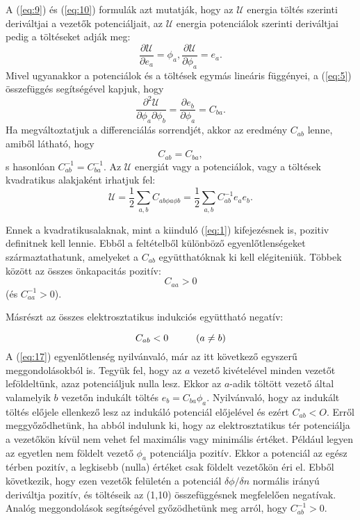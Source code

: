 \documentclass{article}
\begin{document}
A (\ref{eq:9}) és (\ref{eq:10}) formulák azt mutatják, hogy az $\mathcal{U}$ energia töltés szerinti deriváltjai a vezetők potenciáljait, az $\mathcal{U}$ energia potenciálok szerinti deriváltjai pedig a töltéseket adják meg:
\begin{equation} \label{eq:12}
\frac{\partial \mathcal{U}}{\partial e_a} = \phi_a , \frac{\partial \mathcal{U}}{\partial \phi_a} = e_a .
\end{equation}
Mivel ugyanakkor a potenciálok és a töltések egymás lineáris függényei, a (\ref{eq:5}) összefüggés segítségével kapjuk, hogy
\begin{equation} \label{eq:13}
\frac{\partial^2 \mathcal{U}}{\partial \phi_a \partial \phi_b} = \frac{\partial e_b}{\partial \phi_a} = C_{ba}.
\end{equation}
Ha megváltoztatjuk a differenciálás sorrendjét, akkor az eredmény $C_{ab}$ lenne, amiből látható, hogy
\begin{equation} \label{eq:14}
C_{ab} = C_{ba},
\end{equation}
s hasonlóan $C^{-1}_{ab}=C^{-1}_{ba}$. Az $\mathcal{U}$ energiát vagy a potenciálok, vagy a töltések kvadratikus alakjaként irhatjuk fel:
\begin{equation} \label{eq:15}
\mathcal{U} = \frac{1}{2} \sum\limits_{a, b} C_{ab \phi a \phi b} = \frac{1}{2} \sum\limits_{a, b} C^{-1}_{ab} e_a e_b .
\end{equation}

Ennek a kvadratikusalaknak, mint a kiinduló (\ref{eq:1}) kifejezésnek is, pozitiv definitnek kell lennie. Ebből a feltételből különböző egyenlőtlenségeket származtathatunk, amelyeket a $C_{ab}$ együtthatóknak ki kell elégiteniük. Többek között az összes önkapacitás pozitív:
\begin{equation} \label{eq:16}
C_{aa} > 0
\end{equation}
(és $C^{-1}_{aa} > 0$).

Másrészt az összes elektrosztatikus indukciós együttható negatív:

\begin{equation} \label{eq:17}
C_{ab} < 0 \hspace{1 cm} (a \neq b )
\end{equation}
A (\ref{eq:17}) egyenlőtlenség nyilvánvaló, már az itt következő egyszerű meggondolásokból is. Tegyük fel, hogy az $a$ vezető kivételével minden vezetőt leföldeltünk, azaz potenciáljuk nulla lesz. Ekkor az $a$-adik töltött vezető által valamelyik $b$ vezetőn indukált töltés $e_b = C_{ba}\phi_a$. Nyilvánvaló, hogy az indukált töltés előjele ellenkező lesz az indukáló potenciál előjelével és ezért $C_{ab} < O$. Erről meggyőződhetünk, ha abból indulunk ki, hogy az elektrosztatikus tér potenciálja a vezetőkön kívül nem vehet fel maximális vagy minimális értéket. Például legyen az egyetlen nem földelt vezető $\phi_a$ potenciálja pozitív. Ekkor a potenciál az egész térben pozitív, a legkisebb (nulla) értéket csak földelt vezetőkön éri el. Ebből következik, hogy ezen vezetők felületén a potenciál $\delta \phi / \delta n$ normális irányú deriváltja pozitív, és töltéseik az (1,10) összefüggésnek megfelelően negatívak. Analóg meggondolások segítségével győzödhetünk meg arról, hogy $C_{ab}^{-1} > 0$.
\end{document}
